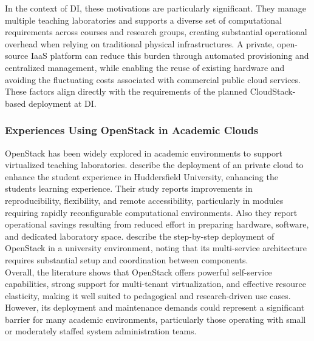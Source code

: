 \documentclass[sigplan]{acmart}
\begin{document}
            In the context of DI, these motivations are particularly significant. They manage multiple teaching laboratories and supports a diverse set of computational requirements across courses and research groups, creating substantial operational overhead when relying on traditional physical infrastructures. A private, open-source IaaS platform can reduce this burden through automated provisioning and centralized management, while enabling the reuse of existing hardware and avoiding the fluctuating costs associated with commercial public cloud services. These factors align directly with the requirements of the planned CloudStack-based deployment at DI.
        
        \subsubsection{Experiences Using OpenStack in Academic Clouds}
            OpenStack has been widely explored in academic environments to support virtualized teaching laboratories. \citeauthor{bonnerUsingOpenStackImprove2013}\cite{bonnerUsingOpenStackImprove2013} describe the deployment of an private cloud to enhance the student experience in Huddersfield University, enhancing the students learning experience. Their study reports improvements in reproducibility, flexibility, and remote accessibility, particularly in modules requiring rapidly reconfigurable computational environments. Also they report operational savings resulting from reduced effort in preparing hardware, software, and dedicated laboratory space. \citeauthor{sheelaDeployingOpenStackCloud2017}\cite{sheelaDeployingOpenStackCloud2017} describe the step-by-step deployment of OpenStack in a university environment, noting that its multi-service architecture requires substantial setup and coordination between components.\\

            Overall, the literature shows that OpenStack offers powerful self-service capabilities, strong support for multi-tenant virtualization, and effective resource elasticity, making it well suited to pedagogical and research-driven use cases. However, its deployment and maintenance demands could represent a significant barrier for many academic environments, particularly those operating with small or moderately staffed system administration teams.           
        
\end{document}
